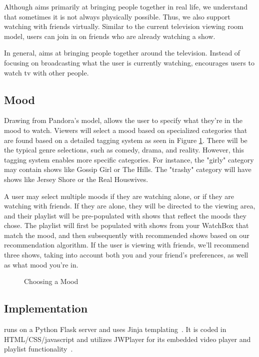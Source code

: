 Although {\sys} aims primarily at bringing people together in real
life, we understand that sometimes it is not always physically
possible.  Thus, we also support watching with friends virtually.
Similar to the current television viewing room model, users can join
in on friends who are already watching a show.

In general, {\sys} aims at bringing people together around the
television.  Instead of focusing on broadcasting what the user is
currently watching, {\sys} encourages users to watch tv with other
people.

\subsection{Mood}
Drawing from Pandora's model, {\sys} allows the user to specify what
they’re in the mood to watch.  Viewers will select a mood based on
specialized categories that are found based on a detailed tagging
system as seen in Figure \ref{fig:mood}.  There will be the typical genre selections, such as comedy,
drama, and reality.  However, this tagging system enables more
specific categories.  For instance, the "girly" category may contain
shows like Gossip Girl or The Hills.  The "trashy" category will have
shows like Jersey Shore or the Real Houswives.

A user may select multiple moods if they are watching alone, or if
they are watching with friends.  If they are alone, they will be
directed to the viewing area, and their playlist will be pre-populated
with shows that reflect the moods they chose.  The playlist will first
be populated with shows from your WatchBox that match the mood, and
then subsequently with recommended shows based on our recommendation
algorithm.  If the user is viewing with friends, we'll recommend three
shows, taking into account both you and your friend's preferences, as
well as what mood you're in.

\begin{figure}
\centering
{}
\caption{Choosing a Mood}
\label{fig:mood}
\end{figure}

\subsection{Implementation}
{\sys} runs on a Python Flask server and uses Jinja
templating~\cite{flask,jinja}.  It is coded in HTML/CSS/javascript and utilizes JWPlayer
for its embedded video player and playlist functionality~\cite{jwplayer}.
